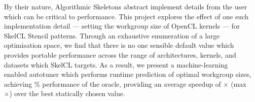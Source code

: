 By their nature, Algorithmic Skeletons abstract implement details from
the user which can be critical to performance. This project explores
the effect of one such implementation detail --- setting the workgroup
size of OpenCL kernels --- for SkelCL Stencil patterns. Through an
exhaustive enumeration of a large optimisation space, we find that
there is no one sensible default value which provides portable
performance across the range of architectures, kernels, and datasets
which SkelCL targets. As a result, we present a machine-learning
enabled autotuner which performs runtime prediction of optimal
workgroup sizes, achieving \% performance of the oracle,
providing an average speedup of $\times$ (max
$\times$) over the best statically chosen value.

